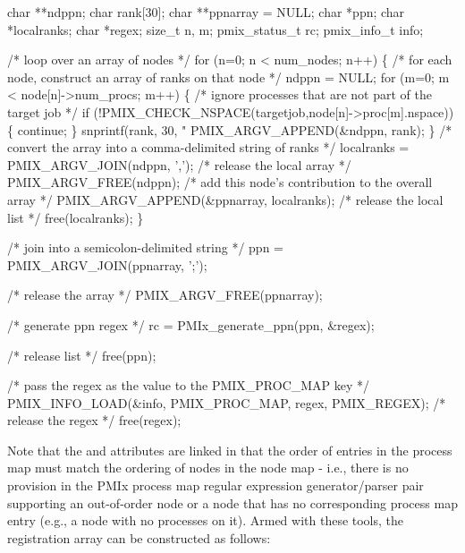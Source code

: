 \cspecificstart
\begin{codepar}
char **ndppn;
char rank[30];
char **ppnarray = NULL;
char *ppn;
char *localranks;
char *regex;
size_t n, m;
pmix_status_t rc;
pmix_info_t info;

/* loop over an array of nodes */
for (n=0; n < num_nodes; n++) \{
    /* for each node, construct an array of ranks on that node */
    ndppn = NULL;
    for (m=0; m < node[n]->num_procs; m++) \{
        /* ignore processes that are not part of the target job */
        if (!PMIX_CHECK_NSPACE(targetjob,node[n]->proc[m].nspace)) \{
            continue;
        \}
        snprintf(rank, 30, "%
        PMIX_ARGV_APPEND(&ndppn, rank);
    \}
    /* convert the array into a comma-delimited string of ranks */
    localranks = PMIX_ARGV_JOIN(ndppn, ',');
    /* release the local array */
    PMIX_ARGV_FREE(ndppn);
    /* add this node's contribution to the overall array */
    PMIX_ARGV_APPEND(&ppnarray, localranks);
    /* release the local list */
    free(localranks);
\}

/* join into a semicolon-delimited string */
ppn = PMIX_ARGV_JOIN(ppnarray, ';');

/* release the array */
PMIX_ARGV_FREE(ppnarray);

/* generate ppn regex */
rc = PMIx_generate_ppn(ppn, &regex);

/* release list */
free(ppn);

/* pass the regex as the value to the PMIX_PROC_MAP key */
PMIX_INFO_LOAD(&info, PMIX_PROC_MAP, regex, PMIX_REGEX);
/* release the regex */
free(regex);
\end{codepar}
\cspecificend

Note that the  and  attributes are linked in that the order of entries in the process map must match the ordering of nodes in the node map - i.e., there is no provision in the \ac{PMIx} process map regular expression generator/parser pair supporting an out-of-order node or a node that has no corresponding process map entry (e.g., a node with no processes on it). Armed with these tools, the registration  array can be constructed as follows:

